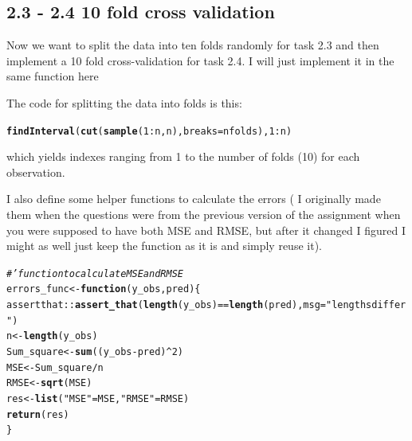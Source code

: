 \documentclass[11pt, a4paper, english]{article}\usepackage[]{graphicx}\usepackage[dvipsnames]{xcolor}
\makeatletter
\newcommand{\hlnum}[1]{\textcolor[rgb]{0.686,0.059,0.569}{#1}}%
\newcommand{\hlstr}[1]{\textcolor[rgb]{0.192,0.494,0.8}{#1}}%
\newcommand{\hlcom}[1]{\textcolor[rgb]{0.678,0.584,0.686}{\textit{#1}}}%
\newcommand{\hlopt}[1]{\textcolor[rgb]{0,0,0}{#1}}%
\newcommand{\hlstd}[1]{\textcolor[rgb]{0.345,0.345,0.345}{#1}}%
\newcommand{\hlkwa}[1]{\textcolor[rgb]{0.161,0.373,0.58}{\textbf{#1}}}%
\newcommand{\hlkwb}[1]{\textcolor[rgb]{0.69,0.353,0.396}{#1}}%
\newcommand{\hlkwc}[1]{\textcolor[rgb]{0.333,0.667,0.333}{#1}}%
\newcommand{\hlkwd}[1]{\textcolor[rgb]{0.737,0.353,0.396}{\textbf{#1}}}%
\newenvironment{kframe}{%
 \def\at@end@of@kframe{}%
 \ifinner\ifhmode%
  \def\at@end@of@kframe{\end{minipage}}%
  \begin{minipage}{\columnwidth}%
 \fi\fi%
 \def\FrameCommand##1{\hskip\@totalleftmargin \hskip-\fboxsep
 \colorbox{shadecolor}{##1}\hskip-\fboxsep
     \hskip-\linewidth \hskip-\@totalleftmargin \hskip\columnwidth}%
 \MakeFramed {\advance\hsize-\width
   \@totalleftmargin\z@ \linewidth\hsize
   \@setminipage}}%
 {\par\unskip\endMakeFramed%
 \at@end@of@kframe}
\newenvironment{knitrout}{}{} %
\makeatother
\begin{document}
\subsection{2.3 - 2.4 10 fold cross validation}
Now we want to split the data into ten folds randomly  for task 2.3 and then implement a 10 fold cross-validation for task 2.4. I will just implement it in the same function here

The code for splitting the data into folds is this:
\begin{knitrout}
\color{fgcolor}\begin{kframe}
\begin{alltt}
\hlkwd{findInterval}\hlstd{(}\hlkwd{cut}\hlstd{(}\hlkwd{sample}\hlstd{(}\hlnum{1}\hlopt{:}\hlstd{n,n),}\hlkwc{breaks}\hlstd{=nfolds),}\hlnum{1}\hlopt{:}\hlstd{n)}
\end{alltt}
\end{kframe}
\end{knitrout}

which yields indexes ranging from 1 to the number of folds (10) for each observation.

I also define some helper functions to calculate the errors ( I originally made them when the questions were from the previous version of the assignment when you were supposed to have both MSE and RMSE, but after it changed I figured I might as well just keep the function as it is  and simply reuse it).
\begin{knitrout}
\color{fgcolor}\begin{kframe}
\begin{alltt}
\hlcom{#' function to calculate MSE and RMSE}
\hlstd{errors_func} \hlkwb{<-} \hlkwa{function}\hlstd{(}\hlkwc{y_obs}\hlstd{,} \hlkwc{pred}\hlstd{)\{}
  \hlstd{assertthat}\hlopt{::}\hlkwd{assert_that}\hlstd{(}\hlkwd{length}\hlstd{(y_obs)} \hlopt{==} \hlkwd{length}\hlstd{(pred),} \hlkwc{msg}\hlstd{=}\hlstr{"lengths differ"}\hlstd{)}
  \hlstd{n} \hlkwb{<-} \hlkwd{length}\hlstd{(y_obs)}
  \hlstd{Sum_square} \hlkwb{<-} \hlkwd{sum}\hlstd{( (y_obs} \hlopt{-} \hlstd{pred)}\hlopt{^}\hlnum{2}\hlstd{)}
  \hlstd{MSE} \hlkwb{<-} \hlstd{Sum_square} \hlopt{/} \hlstd{n}
  \hlstd{RMSE} \hlkwb{<-} \hlkwd{sqrt}\hlstd{(MSE)}
  \hlstd{res} \hlkwb{<-} \hlkwd{list}\hlstd{(}\hlstr{"MSE"}\hlstd{= MSE,} \hlstr{"RMSE"} \hlstd{= RMSE)}
  \hlkwd{return}\hlstd{(res)}
\hlstd{\}}
\end{alltt}
\end{kframe}
\end{knitrout}
\end{document}
